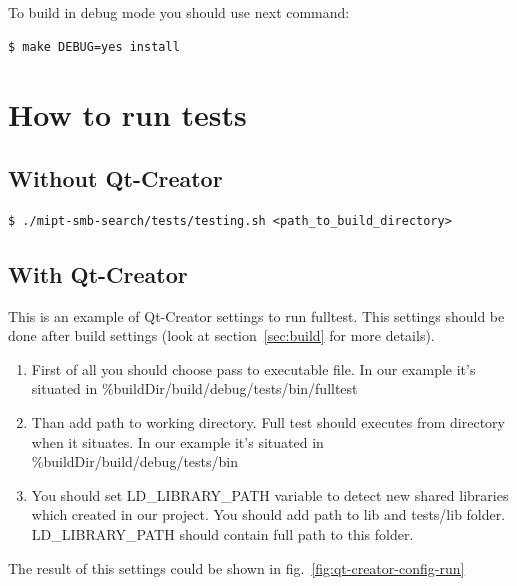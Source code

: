 \documentclass[11pt, oneside, a4paper]{scrartcl}
\begin{document}
To build in debug mode you should use next command:

\begin{lstlisting}
$ make DEBUG=yes install
\end{lstlisting}

\section{How to run tests}\label{sec:tests}

\subsection{Without Qt-Creator}

\begin{lstlisting}
$ ./mipt-smb-search/tests/testing.sh <path_to_build_directory>
\end{lstlisting}

\subsection{With Qt-Creator}

This is an example of Qt-Creator settings to run fulltest. This settings should be done after build settings (look at section~\ref{sec:build} for more details).

\begin{enumerate}
  \item First of all you should choose pass to executable file. In our example it's situated in \%{buildDir}/build/debug/tests/bin/fulltest
  \item Than add path to working directory. Full test should executes from directory when it situates. In our example it's situated in \%{buildDir}/build/debug/tests/bin
  \item You should set LD\_LIBRARY\_PATH variable to detect new shared libraries which created in our project. You should add path to lib and tests/lib folder. LD\_LIBRARY\_PATH should contain full path to this folder.
\end{enumerate}

The result of this settings could be shown in fig.~\ref{fig:qt-creator-config-run}
\end{document}
